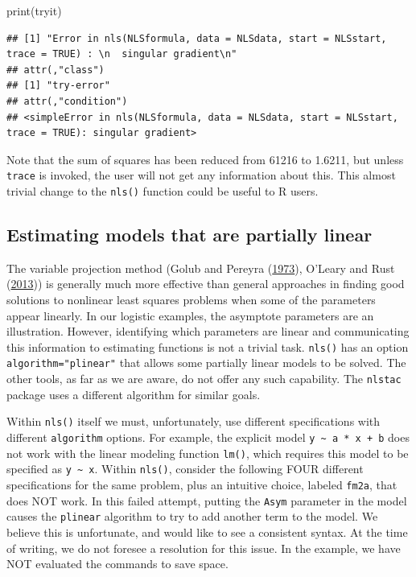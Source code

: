 \documentclass[
]{article}
\newenvironment{Shaded}{\begin{snugshade}}{\end{snugshade}}
\newcommand{\FunctionTok}[1]{\textcolor[rgb]{0.00,0.00,0.00}{#1}}
\newcommand{\NormalTok}[1]{#1}
\begin{document}
\begin{Shaded}
\begin{Highlighting}[]
\FunctionTok{print}\NormalTok{(tryit)}
\end{Highlighting}
\end{Shaded}

\begin{verbatim}
## [1] "Error in nls(NLSformula, data = NLSdata, start = NLSstart, trace = TRUE) : \n  singular gradient\n"
## attr(,"class")
## [1] "try-error"
## attr(,"condition")
## <simpleError in nls(NLSformula, data = NLSdata, start = NLSstart, trace = TRUE): singular gradient>
\end{verbatim}

Note that the sum of squares has been reduced from 61216 to 1.6211, but
unless \texttt{trace} is invoked, the user will not get any information
about this. This almost trivial change to the \texttt{nls()} function
could be useful to R users.

\hypertarget{estimating-models-that-are-partially-linear}{%
\subsection{Estimating models that are partially
linear}\label{estimating-models-that-are-partially-linear}}

The variable projection method (Golub and Pereyra
(\protect\hyperlink{ref-Golub1973}{1973}), O'Leary and Rust
(\protect\hyperlink{ref-OlearyRust13}{2013})) is generally much more
effective than general approaches in finding good solutions to nonlinear
least squares problems when some of the parameters appear linearly. In
our logistic examples, the asymptote parameters are an illustration.
However, identifying which parameters are linear and communicating this
information to estimating functions is not a trivial task.
\texttt{nls()} has an option \texttt{algorithm="plinear"} that allows
some partially linear models to be solved. The other tools, as far as we
are aware, do not offer any such capability. The \texttt{nlstac} package
uses a different algorithm for similar goals.

Within \texttt{nls()} itself we must, unfortunately, use different
specifications with different \texttt{algorithm} options. For example,
the explicit model \texttt{y\ \textasciitilde{}\ a\ *\ x\ +\ b} does not
work with the linear modeling function \texttt{lm()}, which requires
this model to be specified as \texttt{y\ \textasciitilde{}\ x}. Within
\texttt{nls()}, consider the following FOUR different specifications for
the same problem, plus an intuitive choice, labeled \texttt{fm2a}, that
does NOT work. In this failed attempt, putting the \texttt{Asym}
parameter in the model causes the \texttt{plinear} algorithm to try to
add another term to the model. We believe this is unfortunate, and would
like to see a consistent syntax. At the time of writing, we do not
foresee a resolution for this issue. In the example, we have NOT
evaluated the commands to save space.
\end{document}
